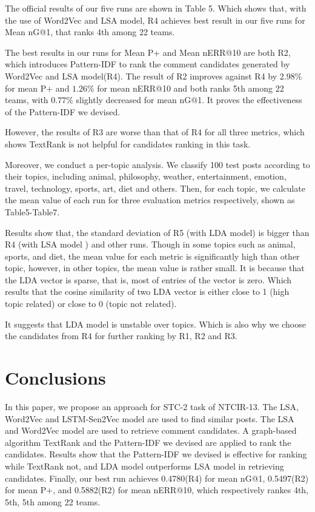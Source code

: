 \documentclass{sig-alternate}
\begin{document}
The official results of our five runs are shown in Table 5. Which shows 
that, with the use of Word2Vec and LSA model, R4 achieves 
best result in our five runs for Mean nG@1, that ranks 4th among 22 teams. 

The best results in our runs for Mean P+ and Mean nERR@10 are both R2, 
which introduces Pattern-IDF to rank the comment candidates generated by 
Word2Vec and LSA model(R4). The result of R2 improves against R4 by $2.98\%$ for mean P+ and $1.26\%$ for mean nERR@10 and both ranks 5th among 22 teams, with $0.77\%$ slightly decreased for mean nG@1. It proves the 
effectiveness of the Pattern-IDF we devised. 

However, the results of R3 are worse than that of R4 for all three metrics, 
which shows TextRank is not helpful for candidates ranking in this task.


Moreover, we conduct a per-topic analysis. We classify 100 test posts according to their topics, including animal, philosophy, weather, entertainment, emotion, travel, technology, sports, art, diet and others. Then, for each topic, we calculate the mean value of each run for three evaluation metrics respectively, shown as Table5-Table7. 

Results show that, the standard deviation of R5 (with LDA model) is bigger than R4 (with LSA model ) and other runs.  
Though in some topics such as animal, sports, and diet, the 
mean value for each metric is significantly high than other topic, however, in other topics, the mean value is rather small. It is because that the LDA vector is sparse, that is, most of entries of the vector is zero. Which results that the cosine similarity of two LDA vector is either close to 1 (high topic related) or close to 0 (topic not related).

It suggests that LDA model is unstable over topics. Which is also why we choose the candidates from R4 for further ranking by R1, R2 and R3.  



\section{Conclusions}
In this paper, we propose an approach for STC-2 task of NTCIR-13. The LSA,
Word2Vec and LSTM-Sen2Vec model are used to find similar posts. The LSA and Word2Vec 
model are used to retrieve comment candidates. A graph-based algorithm TextRank 
and the Pattern-IDF we devised are applied to rank the candidates. Results show 
that the Pattern-IDF we devised is effective for ranking while TextRank not, 
and LDA model outperforms LSA model in retrieving candidates. Finally, our best 
run achieves 0.4780(R4) for mean nG@1, 0.5497(R2) for mean P+, and 0.5882(R2) for 
mean nERR@10, which respectively rankes 4th, 5th, 5th among 22 teams. 
\end{document}

